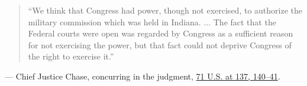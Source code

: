 \documentclass[12pt]{article}
\begin{document}
\begin{quote}
``We think that Congress had power, though not exercised, to authorize the military commission which was held in Indiana. ... The fact that the Federal courts were open was regarded by Congress as a sufficient reason for not exercising the power, but that fact could not deprive Congress of the right to exercise it.''
\end{quote}
\noindent --- Chief Justice Chase, concurring in the judgment, \href{https://supreme.justia.com/cases/federal/us/71/2/}{71 U.S. at 137, 140--41}.
\end{document}
